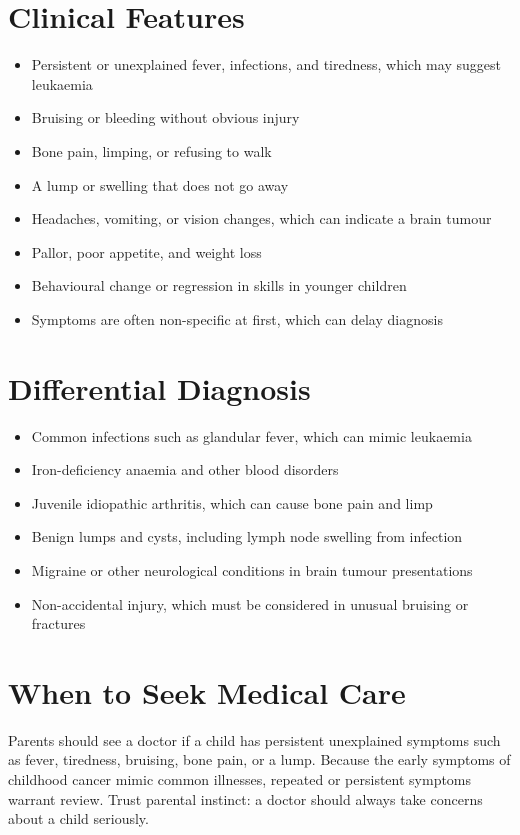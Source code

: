 \section*{Clinical Features}
\begin{itemize}
    \item Persistent or unexplained fever, infections, and tiredness, which may suggest leukaemia
    \item Bruising or bleeding without obvious injury
    \item Bone pain, limping, or refusing to walk
    \item A lump or swelling that does not go away
    \item Headaches, vomiting, or vision changes, which can indicate a brain tumour
    \item Pallor, poor appetite, and weight loss
    \item Behavioural change or regression in skills in younger children
    \item Symptoms are often non-specific at first, which can delay diagnosis
\end{itemize}

\section*{Differential Diagnosis}
\begin{itemize}
    \item Common infections such as glandular fever, which can mimic leukaemia
    \item Iron-deficiency anaemia and other blood disorders
    \item Juvenile idiopathic arthritis, which can cause bone pain and limp
    \item Benign lumps and cysts, including lymph node swelling from infection
    \item Migraine or other neurological conditions in brain tumour presentations
    \item Non-accidental injury, which must be considered in unusual bruising or fractures
\end{itemize}

\section*{When to Seek Medical Care}
Parents should see a doctor if a child has persistent unexplained symptoms such as fever, tiredness, bruising, bone pain, or a lump. Because the early symptoms of childhood cancer mimic common illnesses, repeated or persistent symptoms warrant review. Trust parental instinct: a doctor should always take concerns about a child seriously.


